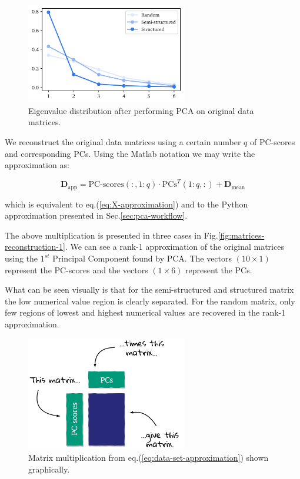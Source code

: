 \documentclass[10pt,twocolumn]{article}
\begin{document}
\begin{figure}[H]
\centering\includegraphics[width=7cm]{DWGs/matrix-reconstruction-eigenvalues-comparison.png}
\caption{Eigenvalue distribution after performing PCA on original data matrices.}			
\label{fig:eigenvalues}
\end{figure}

We reconstruct the original data matrices using a certain number $q$ of PC-scores and corresponding PCs. Using the Matlab notation we may write the approximation as:

\begin{equation} \label{eq:data-set-approximation}
\bm{D}_{\text{app}} = \text{PC-scores}(:,1:q) \cdot \text{PCs}^T(1:q,:) + \bm{D}_{\text{mean}}
\end{equation}

which is equivalent to eq.(\ref{eq:X-approximation}) and to the Python approximation presented in Sec.\ref{sec:pca-workflow}.

The above multiplication is presented in three cases in Fig.\ref{fig:matrices-reconstruction-1}. We can see a rank-1 approximation of the original matrices using the $1^{st}$ Principal Component found by PCA. The vectors $(10 \times 1)$ represent the PC-scores and the vectors $(1 \times 6)$ represent the PCs.

What can be seen visually is that for the semi-structured and structured matrix the low numerical value region is clearly separated. For the random matrix, only few regions of lowest and highest numerical values are recovered in the rank-1 approximation.

\begin{figure}[H]
\centering\includegraphics[width=7cm]{DWGs/matrix-multiplication-explanation.png}
\caption{Matrix multiplication from eq.(\ref{eq:data-set-approximation}) shown graphically.}			
\label{fig:matrix-multiplication-graphically}
\end{figure}
\end{document}

